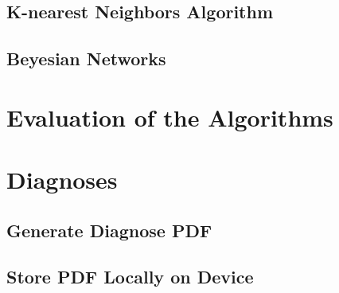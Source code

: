 \subsection{K-nearest Neighbors Algorithm}
\subsection{Beyesian Networks}
\section{Evaluation of the Algorithms}
\section{Diagnoses}
\subsection{Generate Diagnose PDF}
\subsection{Store PDF Locally on Device}
